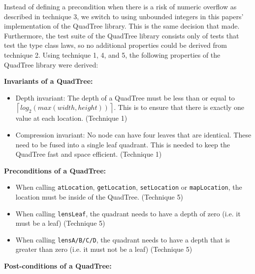 Instead of defining a precondition when there is a risk of numeric overflow as described in technique 3, we switch to using unbounded integers in this papers' implementation of the QuadTree library. This is the same decision that \cite{BREITNER2021} made. Furthermore, the test suite of the QuadTree library consists only of tests that test the type class laws, so no additional properties could be derived from technique 2. Using technique 1, 4, and 5, the following properties of the QuadTree library were derived: 

\setlength{\parindent}{0pt} \setlength{\parskip}{5pt}
\textbf{Invariants of a QuadTree:}
\begin{itemize}
    \item Depth invariant: The depth of a QuadTree must be less than or equal to \linebreak $\left \lceil{log_{2}( max(width, height))}\right \rceil$. This is to ensure that there is exactly one value at each location. (Technique 1)
    \item Compression invariant: No node can have four leaves that are identical. These need to be fused into a single leaf quadrant. This is needed to keep the QuadTree fast and space efficient. (Technique 1)
\end{itemize} 
\textbf{Preconditions of a QuadTree:}
\begin{itemize}
    \item When calling \verb|atLocation|, \verb|getLocation|, \verb|setLocation| or \verb|mapLocation|, the location must be inside of the QuadTree. (Technique 5)
    \item When calling \verb|lensLeaf|, the quadrant needs to have a depth of zero (i.e.  it must be a leaf) (Technique 5)
    \item When calling \verb|lensA/B/C/D|, the quadrant needs to have a depth that is greater than zero (i.e.  it must not be a leaf) (Technique 5)
\end{itemize} 
\textbf{Post-conditions of a QuadTree:}
